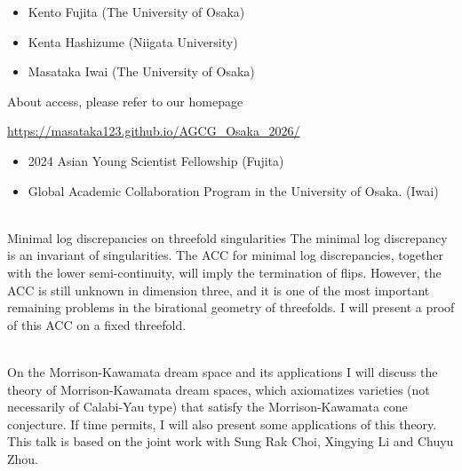 \documentclass[dvipdfmx,a4paper,12pt]{article}
\theoremstyle{plain} %
\theoremstyle{definition} %
\begin{document}
  \vskip5mm
\begin{itemize}
  \setlength{\parskip}{0cm} 
  \setlength{\itemsep}{0cm}
\item Kento Fujita (The University of Osaka)
\item Kenta Hashizume (Niigata University)
\item Masataka Iwai (The University of Osaka)
  \end{itemize}

\vskip5mm


About access, please refer to our homepage
\begin{center}
\url{https://masataka123.github.io/AGCG_Osaka_2026/}
\end{center}



\begin{itemize}
  \setlength{\parskip}{0cm} 
  \setlength{\itemsep}{0cm}
\item 2024 Asian Young Scientist Fellowship (Fujita)
 \item Global Academic Collaboration Program in the University of Osaka. (Iwai)
  \end{itemize}

\newpage
\begin{center}
\end{center}
\vskip5mm

\vskip5mm
\\
Minimal log discrepancies on threefold singularities
\vskip3mm
The minimal log discrepancy is an invariant of singularities.
The ACC for minimal log discrepancies, together with the lower
semi-continuity, will imply the termination of flips. However, the ACC is
still unknown in dimension three, and it is one of the most important
remaining problems in the birational geometry of threefolds. I will
present a proof of this ACC on a fixed threefold.
\vskip8mm

\\
On the Morrison-Kawamata dream space and its applications
\vskip3mm
I will discuss the theory of Morrison-Kawamata dream spaces, which axiomatizes varieties (not necessarily of Calabi-Yau type) that satisfy the Morrison-Kawamata cone conjecture. If time permits, I will also present some applications of this theory. This talk is based on the joint work with Sung Rak Choi, Xingying Li and Chuyu Zhou.
\vskip8mm
\end{document}
